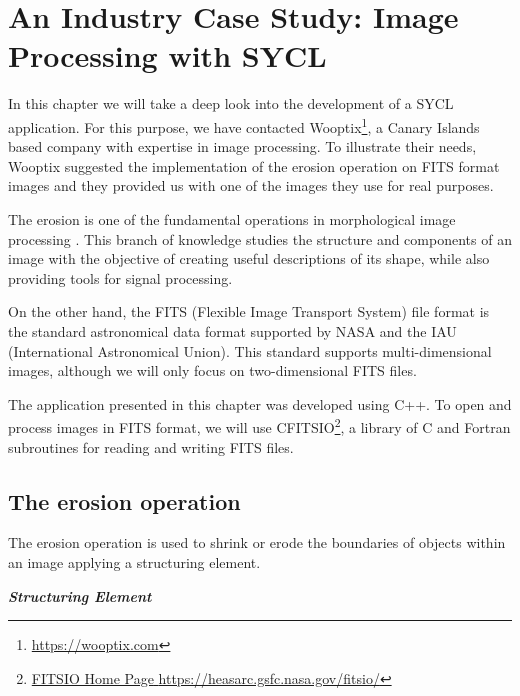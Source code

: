 %
%
%

\chapter{An Industry Case Study: Image Processing with SYCL} \label{chap:CaseStudy} 

In this chapter we will take a deep look into the development of a SYCL application.
For this purpose, we have contacted Wooptix\footnote{\url{https://wooptix.com}}, a Canary Islands based company with expertise in image processing.
To illustrate their needs, Wooptix suggested the implementation of the erosion operation on FITS format images and they provided us with one of the images they use for real purposes.

The erosion is one of the fundamental operations in morphological image processing \cite{Gonzalez:2008:Digital}.
This branch of knowledge studies the structure and components of an image with the objective of creating useful descriptions of its shape, while also providing tools for signal processing.

On the other hand, the FITS (Flexible Image Transport System) file format is the standard astronomical data format supported by NASA and the IAU (International Astronomical Union).
This standard supports multi-dimensional images, although we will only focus on two-dimensional FITS files.

The application presented in this chapter was developed using C++.
To open and process images in FITS format, we will use CFITSIO\footnote{\href{https://heasarc.gsfc.nasa.gov/fitsio/}{{FITSIO Home Page} \url{https://heasarc.gsfc.nasa.gov/fitsio/}}}, a library of C and Fortran subroutines for reading and writing FITS files.

\section{The erosion operation}

The erosion operation is used to shrink or erode the boundaries of objects within an image applying a structuring element.

\vspace{5mm}
\textsl{\textbf{{Structuring Element}}}
\vspace{2mm}

